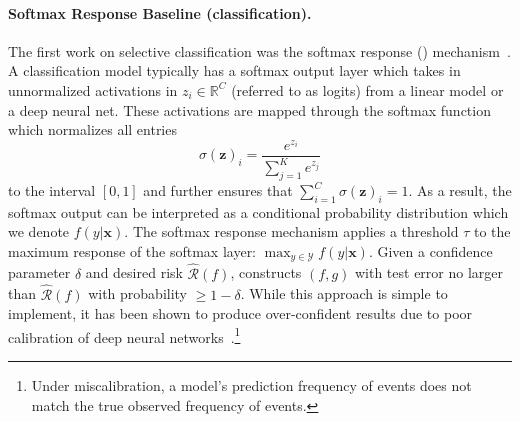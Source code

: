 

\paragraph{Softmax Response Baseline (classification).} The first work on selective classification was the softmax response (\sr) mechanism~\citep{hendrycks2016baseline, geifman2017selective}. A classification model typically has a softmax output layer which takes in unnormalized activations in $z_{i} \in \mathbb{R}^C$ (referred to as logits) from a linear model or a deep neural net. These activations are mapped through the softmax function which normalizes all entries 
\begin{equation}
    \sigma(\bm{z})_{i}=\frac{e^{z_{i}}}{\sum_{j=1}^{K} e^{z_{j}}}
\end{equation}
to the interval $[0,1]$ and further ensures that $\sum_{i=1}^{C} \sigma(\bm{z})_{i} = 1$. As a result, the softmax output can be interpreted as a conditional probability distribution which we denote $f(y|\bm{x})$.
The softmax response mechanism applies a threshold $\tau$ to the maximum response of the softmax layer: $\max_{y \in \mathcal{Y}}f(y|\bm{x})$. 
Given a confidence parameter $\delta$ and desired risk $\hat{\mathcal{R}}(f)$, \sr constructs $(f, g)$ with test error no larger than $\hat{\mathcal{R}}(f)$ with probability $\geq 1-\delta$. 
While this approach is simple to implement, it has been shown to produce over-confident results due to poor calibration of deep neural networks~\citep{guo2017calibration}.\footnote{Under miscalibration, a model's prediction frequency of events does not match the true observed frequency of events.} 

